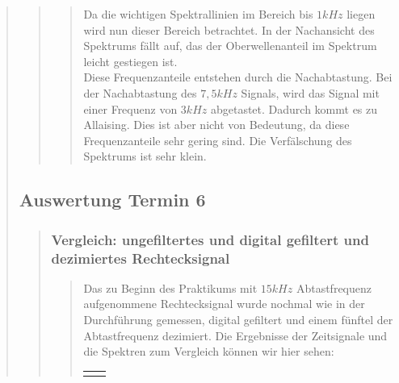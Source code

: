 \begin{quote}
\begin{quote}
\begin{quote}
            Da die wichtigen Spektrallinien im Bereich bis $1kHz$ liegen wird nun dieser Bereich betrachtet. In der
            Nachansicht des Spektrums fällt auf, das der Oberwellenanteil im Spektrum leicht gestiegen ist.\\
            Diese Frequenzanteile entstehen durch die Nachabtastung. Bei der Nachabtastung des $7,5kHz$ Signals, wird
            das Signal mit einer Frequenz von $3kHz$ abgetastet. Dadurch kommt es zu Allaising. Dies ist aber nicht von
            Bedeutung, da diese Frequenzanteile sehr gering sind. Die Verfälschung des Spektrums ist sehr klein.
			
		\end{quote} %
    \end{quote}  %
    
    \subsection{Auswertung Termin 6}
    \begin{quote}
        
        \subsubsection{Vergleich: ungefiltertes und digital gefiltert und
        dezimiertes Rechtecksignal}
        \begin{quote}
        
        Das zu Beginn des Praktikums mit $15 kHz$ Abtastfrequenz aufgenommene
        Rechtecksignal wurde nochmal wie in der Durchführung gemessen, digital
        gefiltert und einem fünftel der Abtastfrequenz dezimiert. Die Ergebnisse
        der Zeitsignale und die Spektren zum Vergleich können wir hier sehen:
        
        \begin{center}
                \begin{tabular}{ll}
    
                \hspace{-11em}
                    \begin{minipage}{0.6\textwidth}
    

\end{minipage}
\end{tabular}
\end{center}
\end{quote}
\end{quote}
\end{quote}
